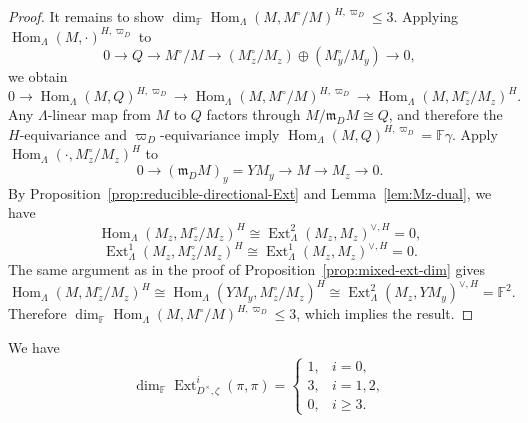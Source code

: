 \documentclass[11pt,a4paper]{article} %
\def\FF{\mathbb{F}}
\def\dim{\operatorname{dim}}
\def\Ext{\operatorname{Ext}} %
\def\Hom{\operatorname{Hom}}
\begin{document}
\begin{proof}
It remains to show $\dim_\FF\Hom_\Lambda(M,M^\circ/M)^{H,\varpi_D}\le3$. Applying $\Hom_{\Lambda}(M,\cdot)^{H,\varpi_D}$ to
\[
0\longrightarrow Q\longrightarrow M^\circ/M
\longrightarrow (M_z^\circ/M_z)\oplus(M_y^\circ/M_y)
\longrightarrow0,
\]
we obtain
\[
0\longrightarrow\Hom_{\Lambda}(M,Q)^{H,\varpi_D}\longrightarrow\Hom_{\Lambda}(M,M^\circ/M)^{H,\varpi_D}\longrightarrow\Hom_{\Lambda}(M,M_z^\circ/M_z)^H.
\]
Any $\Lambda$-linear map from $M$ to $Q$ factors through $M/\mathfrak m_D M
\cong Q$, and therefore the $H$-equivariance and $\varpi_D$-equivariance imply $\Hom_{\Lambda}(M,Q)^{H,\varpi_D}=\FF\gamma$. Apply $\Hom_{\Lambda}(\cdot,M_z^\circ/M_z)^H$ to
\[
0\longrightarrow(\mathfrak m_D M)_y=YM_y\longrightarrow M\longrightarrow M_z\longrightarrow0.
\]
By Proposition~\ref{prop:reducible-directional-Ext} and Lemma~\ref{lem:Mz-dual}, we have
\[
\Hom_\Lambda(M_z,M_z^\circ/M_z)^H\cong\Ext^2_\Lambda(M_z,M_z)^{\vee,H}=0,
\]
\[
\Ext^1_\Lambda(M_z,M_z^\circ/M_z)^H\cong\Ext^1_\Lambda(M_z,M_z)^{\vee,H}=0.
\]
The same argument as in the proof of Proposition~\ref{prop:mixed-ext-dim} gives
\[
\Hom_\Lambda(M,M_z^\circ/M_z)^H
\cong
\Hom_\Lambda(YM_y,M_z^\circ/M_z)^H\cong\Ext^2_\Lambda(M_z,YM_y)^{\vee,H}=\FF^2.
\]
Therefore $\dim_\FF\Hom_\Lambda(M,M^\circ/M)^{H,\varpi_D}\le3$, which implies the result.
\end{proof}

\begin{theorem}\label{thm:reducible-self-extensions}
We have
\[
\dim_\FF\Ext^i_{D^\times,\zeta}(\pi,\pi)
=\begin{cases}
1,&i=0,\\
3,&i=1,2,\\
0,&i\ge3.
\end{cases}
\]
\end{theorem}
\end{document}

